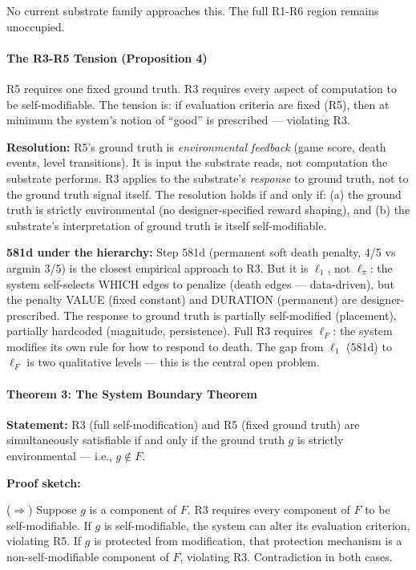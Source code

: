 \documentclass[
  11pt,
]{article}
\begin{document}
No current substrate family approaches this. The full R1-R6 region
remains unoccupied.

\paragraph{The R3-R5 Tension (Proposition
4)}\label{the-r3-r5-tension-proposition-4}

R5 requires one fixed ground truth. R3 requires every aspect of
computation to be self-modifiable. The tension is: if evaluation
criteria are fixed (R5), then at minimum the system's notion of ``good''
is prescribed --- violating R3.

\textbf{Resolution:} R5's ground truth is \emph{environmental feedback}
(game score, death events, level transitions). It is input the substrate
reads, not computation the substrate performs. R3 applies to the
substrate's \emph{response} to ground truth, not to the ground truth
signal itself. The resolution holds if and only if: (a) the ground truth
is strictly environmental (no designer-specified reward shaping), and
(b) the substrate's interpretation of ground truth is itself
self-modifiable.

\textbf{581d under the hierarchy:} Step 581d (permanent soft death
penalty, 4/5 vs argmin 3/5) is the closest empirical approach to R3. But
it is \(\ell_1\), not \(\ell_\pi\): the system self-selects WHICH edges
to penalize (death edges --- data-driven), but the penalty VALUE (fixed
constant) and DURATION (permanent) are designer-prescribed. The response
to ground truth is partially self-modified (placement), partially
hardcoded (magnitude, persistence). Full R3 requires \(\ell_F\): the
system modifies its own rule for how to respond to death. The gap from
\(\ell_1\) (581d) to \(\ell_F\) is two qualitative levels --- this is
the central open problem.

\paragraph{Theorem 3: The System Boundary
Theorem}\label{theorem-3-the-system-boundary-theorem}

\textbf{Statement:} R3 (full self-modification) and R5 (fixed ground
truth) are simultaneously satisfiable if and only if the ground truth
\(g\) is strictly environmental --- i.e., \(g \notin F\).

\textbf{Proof sketch:}

(\(\Rightarrow\)) Suppose \(g\) is a component of \(F\). R3 requires
every component of \(F\) to be self-modifiable. If \(g\) is
self-modifiable, the system can alter its evaluation criterion,
violating R5. If \(g\) is protected from modification, that protection
mechanism is a non-self-modifiable component of \(F\), violating R3.
Contradiction in both cases.
\end{document}
